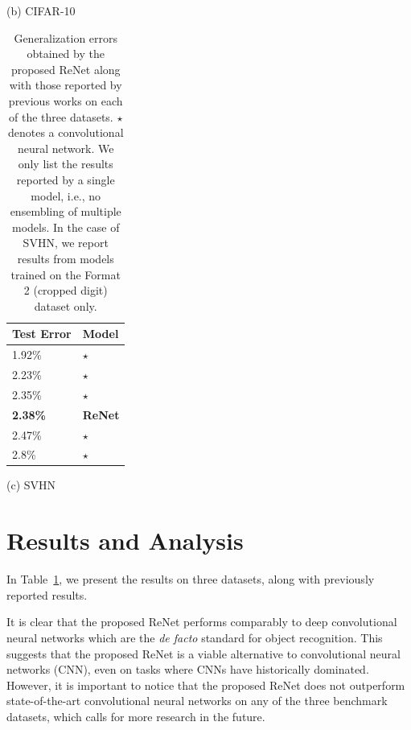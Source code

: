\begin{table}[ht]
\begin{minipage}{0.45\textwidth}
        \vspace{2mm}
        (b) CIFAR-10
    \end{minipage}

    \vspace{4mm}
    \begin{minipage}{0.45\textwidth}
        \centering
        \begin{tabular}{l |  l}
            Test Error & Model  \\
            \hline
1.92\% & \citep{DBLP:journals/corr/LeeXGZT14}$\star$ \\
2.23\% & \citep{DBLP:conf/icml/WanZZLF13}$\star$ \\
2.35\% & \citep{Lin2014}$\star$ \\
\bf{2.38\%} & \bf{ReNet} \\
2.47\% & \citep{Goodfellow2013}$\star$ \\
2.8\% & \citep{DBLP:journals/corr/abs-1301-3557}$\star$ \\
        \end{tabular}

        \vspace{2mm}
        (c) SVHN
    \end{minipage}
    \hfill
    \begin{minipage}{0.45\textwidth}
        \caption{Generalization errors obtained by the
            proposed ReNet along with those reported by previous works
            on each of the three datasets. $\star$ denotes a
            convolutional neural network. We only list the results reported by a single
            model, i.e., no ensembling of multiple models.
            In the case of SVHN, we report results from models trained on
            the Format 2 (cropped digit) dataset only.}
        \label{tbl:result}
    \end{minipage}
\end{table}

\section{Results and Analysis}

In Table~\ref{tbl:result}, we present the results on three datasets,
along with previously reported results.

It is clear that the proposed ReNet performs comparably to deep convolutional
neural networks which are the {\it de facto} standard for object recognition.
This suggests that the proposed ReNet is a viable alternative to convolutional
neural networks (CNN), even on tasks where CNNs have historically dominated.
However, it is important to notice that the proposed ReNet does not outperform
state-of-the-art convolutional neural networks on any of the three benchmark
datasets, which calls for more research in the future.

